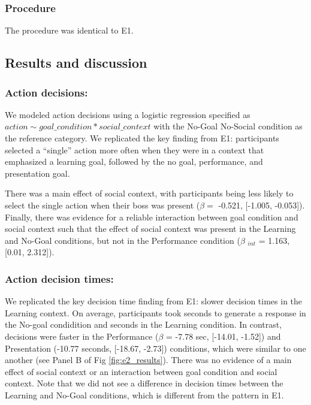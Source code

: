 \documentclass[10pt, letterpaper]{article}
\begin{document}
\subsubsection{Procedure}\label{procedure-1}

The procedure was identical to E1.

\subsection{Results and discussion}\label{results-and-discussion-1}

\subsubsection{Action decisions:}\label{action-decisions-1}

We modeled action decisions using a logistic regression specified as
\texttt{$action \sim goal\_condition * social\_context$} with the
No-Goal No-Social condition as the reference category. We replicated the
key finding from E1: participants selected a ``single'' action more
often when they were in a context that emphasized a learning goal,
followed by the no goal, performance, and presentation goal.

There was a main effect of social context, with participants being less
likely to select the single action when their boss was present
(\(\beta =\) -0.521, {[}-1.005, -0.053{]}). Finally, there was evidence
for a reliable interaction between goal condition and social context
such that the effect of social context was present in the Learning and
No-Goal conditions, but not in the Performance condition (\(\beta\)
\(_{int}\) = 1.163, {[}0.01, 2.312{]}).

\subsubsection{Action decision times:}\label{action-decision-times-1}

We replicated the key decision time finding from E1: slower decision
times in the Learning context. On average, participants took seconds to
generate a response in the No-goal condidition and seconds in the
Learning condition. In contrast, decisions were faster in the
Performance (\(\beta\) = -7.78 sec, {[}-14.01, -1.52{]}) and
Presentation (-10.77 seconds, {[}-18.67, -2.73{]}) conditions, which
were similar to one another (see Panel B of Fig \ref{fig:e2_results}).
There was no evidence of a main effect of social context or an
interaction between goal condition and social context. Note that we did
not see a difference in decision times between the Learning and No-Goal
conditions, which is different from the pattern in E1.
\end{document}
